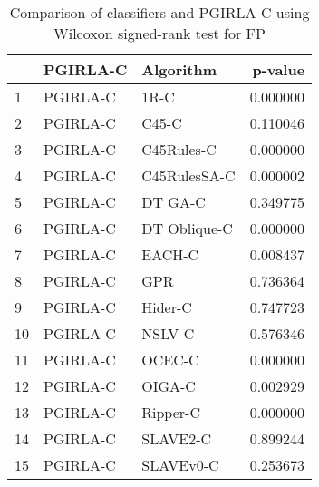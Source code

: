 \begin{table}
\footnotesize
\caption{Comparison of classifiers and PGIRLA-C using Wilcoxon signed-rank test for FP}
\label{tab:PGIRLA-C wilcoxon FP comparison}
\begin{tabular}{lllr}
\hline
 & PGIRLA-C & Algorithm & p-value \\
\hline
1 & PGIRLA-C & 1R-C & 0.000000 \\
2 & PGIRLA-C & C45-C & 0.110046 \\
3 & PGIRLA-C & C45Rules-C & 0.000000 \\
4 & PGIRLA-C & C45RulesSA-C & 0.000002 \\
5 & PGIRLA-C & DT GA-C & 0.349775 \\
6 & PGIRLA-C & DT Oblique-C & 0.000000 \\
7 & PGIRLA-C & EACH-C & 0.008437 \\
8 & PGIRLA-C & GPR & 0.736364 \\
9 & PGIRLA-C & Hider-C & 0.747723 \\
10 & PGIRLA-C & NSLV-C & 0.576346 \\
11 & PGIRLA-C & OCEC-C & 0.000000 \\
12 & PGIRLA-C & OIGA-C & 0.002929 \\
13 & PGIRLA-C & Ripper-C & 0.000000 \\
14 & PGIRLA-C & SLAVE2-C & 0.899244 \\
15 & PGIRLA-C & SLAVEv0-C & 0.253673 \\
\hline
\end{tabular}
\end{table}
